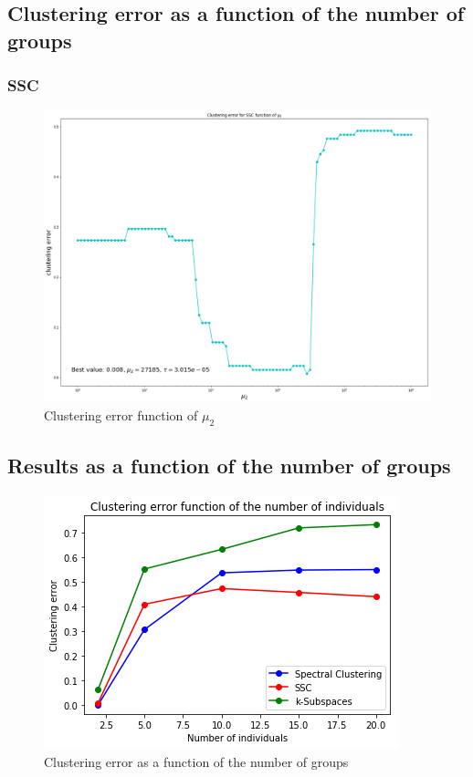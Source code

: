\documentclass[a4paper, 11pt]{article}
\begin{document}
\subsection{Clustering error as a function of the number of groups}





\subsubsection{SSC}

\begin{figure}[H]
	\centering
	\includegraphics[width=.7\linewidth]{imgs/SSC_tune_mu2.png}
	\caption{Clustering error function of $\mu_2$}
	\label{fig:ssc_tune_mu2}
\end{figure}

\subsection{Results as a function of the number of groups}

\begin{figure}[H]
	\centering
	\includegraphics[width=.7\linewidth]{imgs/algos_comparison.png}
	\caption{Clustering error as a function of the number of groups}
	\label{fig:graphs}
\end{figure}
\end{document}
